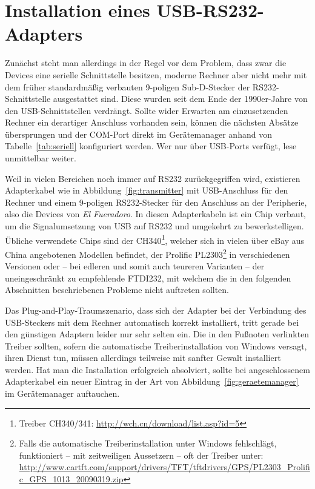 \documentclass[pdftex, parskip, numbers=noenddot, toc=listof]{scrbook}
\newcommand{\anlage}{\emph{El Fueradoro}}
\begin{document}
	\section{Installation eines USB-RS232-Adapters}
	\label{sec:usbadapter}

	Zunächst steht man allerdings in der Regel vor dem Problem, dass zwar die Devices eine serielle Schnittstelle besitzen, moderne Rechner aber nicht mehr mit dem früher standardmäßig verbauten 9-poligen Sub-D-Stecker der RS232-Schnittstelle ausgestattet sind. Diese wurden seit dem Ende der 1990er-Jahre von den USB-Schnittstellen verdrängt. Sollte wider Erwarten am einzusetzenden Rechner ein derartiger Anschluss vorhanden sein, können die nächsten Absätze übersprungen und der COM-Port direkt im Gerätemanager anhand von Tabelle~\ref{tab:seriell} konfiguriert werden. Wer nur über USB-Ports verfügt, lese unmittelbar weiter.

	Weil in vielen Bereichen noch immer auf RS232 zurückgegriffen wird, existieren Adapterkabel wie in Abbildung~\ref{fig:transmitter} mit USB-Anschluss für den Rechner und einem 9-poligen RS232-Stecker für den Anschluss an der Peripherie, also die Devices von {\anlage}. In diesen Adapterkabeln ist ein Chip verbaut, um die Signalumsetzung von USB auf RS232 und umgekehrt zu bewerkstelligen. Übliche verwendete Chips sind der CH340\footnote{Treiber CH340/341: \url{http://wch.cn/download/list.asp?id=5}}, welcher sich in vielen über eBay aus China angebotenen Modellen befindet, der Prolific PL2303\footnote{Falls die automatische Treiberinstallation unter Windows fehlschlägt, funktioniert -- mit zeitweiligen Aussetzern -- oft der Treiber unter: \url{http://www.cartft.com/support/drivers/TFT/tftdrivers/GPS/PL2303_Prolific_GPS_1013_20090319.zip}} in verschiedenen Versionen oder -- bei edleren und somit auch teureren Varianten -- der uneingeschränkt zu empfehlende FTDI232, mit welchem die in den folgenden Abschnitten beschriebenen Probleme nicht auftreten sollten.

	Das Plug-and-Play-Traum\-szenario, dass sich der Adapter bei der Verbindung des USB-Steckers mit dem Rechner automatisch korrekt installiert, tritt gerade bei den günstigen Adaptern leider nur sehr selten ein. Die in den Fußnoten verlinkten Treiber sollten, sofern die automatische Treiberinstallation von Windows versagt, ihren Dienst tun, müssen allerdings teilweise mit sanfter Gewalt installiert werden. Hat man die Installation erfolgreich absolviert, sollte bei angeschlossenem Adapterkabel ein neuer Eintrag in der Art von Abbildung~\ref{fig:geraetemanager} im Gerätemanager auftauchen.
\end{document}
